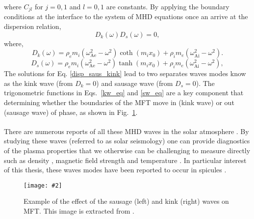 \documentclass[12pt]{ociamthesis}
\newcommand{\eref}[1]{Eq. \eqref{#1}}
\newcommand{\mfig}[4]{
  \begin{figure}
  \begin{center}
  \texttt{[image: \#2]}
  \caption{#3}
  \label{#4}
  \end{center}
  \end{figure}}
\newcommand{\np}{\\ \\}
\begin{document}
where $C_{jl}$ for $j=0,1$ and $l=0,1$ are constants. By applying the boundary conditions at the interface to the system of MHD equations once an arrive at the dispersion relation,
\begin{equation}\label{disp_saus_kink}
    D_k(\omega)D_s(\omega)  = 0,
\end{equation}
where,
\begin{equation}\label{kw_eq}
    D_k(\omega) = \rho_em_i(\omega_\textrm{Ae}^2 - \omega^2)\coth{(m_ix_0)} + \rho_im_e(\omega_\textrm{Ai}^2 - \omega^2).
\end{equation}
\begin{equation}\label{sw_eq}
    D_s(\omega) = \rho_em_i(\omega_\textrm{Ae}^2 - \omega^2)\tanh{(m_ix_0)} + \rho_im_e(\omega_\textrm{Ai}^2 - \omega^2),
\end{equation}
The solutions for \eref{disp_saus_kink} lead to two separates waves modes know as the kink wave (from $D_k =0$) and sausage wave (from $D_s =0$). The trigonometric functions in Eqs.~\eqref{kw_eq} and \eqref{sw_eq} are a key component that determining whether the boundaries of the MFT move in (kink wave) or out (sausage wave) of phase, as shown in Fig.~\ref{KW_SW}. \np
%
There are numerous reports of all these MHD waves in the solar atmosphere \citep{Tomczyk2007Sci3171192T, Tomczyk2009ApJ6971384T, jess_alfven_2009, Morton2012NatCo31315M}. By studying these waves (referred to as solar seismology) one can provide diagnostics of the plasma properties that we otherwise can be challenging to measure directly such as density \citep{Verwichte_2013A_A}, magnetic field strength \citep{Nakariakov_2001} and temperature \citep{De_Moortel_2003SoPh}. In particular interest of this thesis, these waves modes have been reported to occur in spicules \citep{Kukhianidze2006AA, Okamoto2011ApJ736L24O, Jess2012ApJ744L5J, Verth2016GMS216431V, Sharma2018ApJ85361S}.
\mfig{0.75}{figures/KW_SW.png}{Example of the effect of the sausage (left) and kink (right) waves on MFT. This image is extracted from \cite{Morton2012NatCo31315M}.}{KW_SW}
\end{document}
